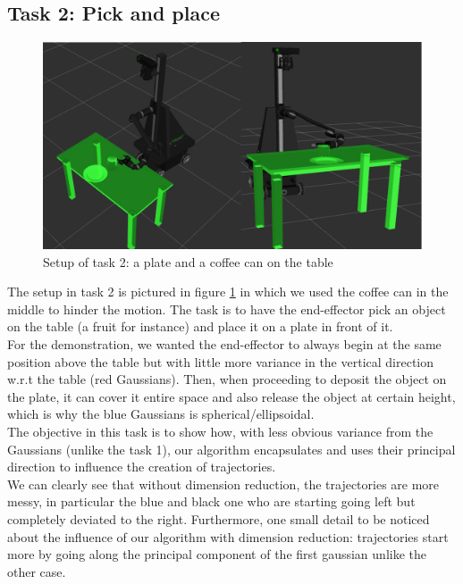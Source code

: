 \documentclass[letterpaper, 10 pt, conference]{ieeeconf}  %
\begin{document}
\subsection{Task 2: Pick and place}
\begin{figure}[h]
	\centering
	\includegraphics[scale=0.2]{figure/task2Scenario.png}
	\caption{Setup of task 2: a plate and a coffee can on the table}
	\label{task2Scenario}
\end{figure}
The setup in task 2 is pictured in figure \ref{task2Scenario} in which we used the coffee can in the middle to hinder the motion. The task is to have the end-effector pick an object on the table (a fruit for instance) and place it on a plate in front of it. \\
 For the demonstration, we wanted the end-effector to always begin at the same position above the table but with little more variance in the vertical direction w.r.t the table (red Gaussians). Then, when proceeding to deposit the object on the plate, it can cover it entire space and also release the object at certain height, which is why the blue Gaussians is spherical/ellipsoidal.\\
The objective in this task is to show how, with less obvious variance from the Gaussians (unlike the task 1), our algorithm encapsulates and uses their principal direction to influence the creation of trajectories.\\
We can clearly see that without dimension reduction, the trajectories are more messy, in particular the blue and black one who are starting going left but completely deviated to the right. Furthermore, one small detail to be noticed about the influence of our algorithm with dimension reduction: trajectories start more by going along the principal component of the first gaussian unlike the other case. 
\end{document}
